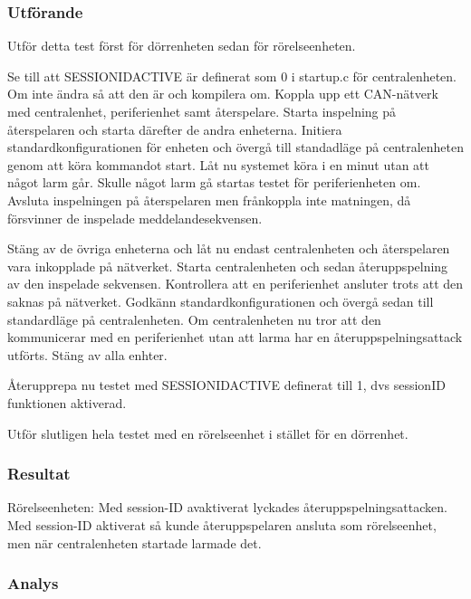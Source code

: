 \subsubsection*{Utförande}
Utför detta test först för dörrenheten sedan för rörelseenheten.


Se till att SESSIONIDACTIVE är definerat som 0 i startup.c för centralenheten.
Om inte ändra så att den är och kompilera om.
Koppla upp ett CAN-nätverk med centralenhet, periferienhet samt återspelare.
Starta inspelning på återspelaren och starta därefter de andra enheterna.
Initiera standardkonfigurationen för enheten och övergå till standadläge på centralenheten genom att köra kommandot start.
Låt nu systemet köra i en minut utan att något larm går.
Skulle något larm gå startas testet för periferienheten om.
Avsluta inspelningen på återspelaren men frånkoppla inte matningen, då försvinner de inspelade meddelandesekvensen.


Stäng av de övriga enheterna och låt nu endast centralenheten och återspelaren vara inkopplade på nätverket.
Starta centralenheten och sedan återuppspelning av den inspelade sekvensen. Kontrollera att en periferienhet ansluter trots att den saknas på nätverket.
Godkänn standardkonfigurationen och övergå sedan till standardläge på centralenheten.
Om centralenheten nu tror att den kommunicerar med en periferienhet utan att larma har en återuppspelningsattack utförts.
Stäng av alla enhter.

Återupprepa nu testet med SESSIONIDACTIVE definerat till 1, dvs sessionID funktionen aktiverad.

Utför slutligen hela testet med en rörelseenhet i stället för en dörrenhet.



\subsubsection*{Resultat}
Rörelseenheten: Med session-ID avaktiverat lyckades återuppspelningsattacken. Med session-ID aktiverat så kunde återuppspelaren ansluta som rörelseenhet, men när centralenheten startade larmade det. 


\subsubsection*{Analys}



